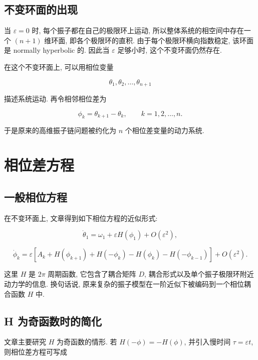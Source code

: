 \documentclass[oneside]{ctexart}
\newcommand{\eps}{\varepsilon}
\begin{document}
\subsection{不变环面的出现}

当 $\eps=0$ 时, 每个振子都在自己的极限环上运动, 所以整体系统的相空间中存在一个 $(n+1)$ 维环面, 即各个极限环的直积. 由于每个极限环横向指数稳定, 该环面是 normally hyperbolic 的. 因此当 $\eps$ 足够小时, 这个不变环面仍然存在.

在这个不变环面上, 可以用相位变量

\begin{equation}
    \theta_1,\theta_2,\dots,\theta_{n+1}
\end{equation}

描述系统运动. 再令相邻相位差为

\begin{equation}
    \phi_k=\theta_{k+1}-\theta_k,
    \qquad k=1,2,\dots,n.
\end{equation}

于是原来的高维振子链问题被约化为 $n$ 个相位差变量的动力系统.

\section{相位差方程}

\subsection{一般相位方程}

在不变环面上, 文章得到如下相位方程的近似形式:

\begin{equation}
    \dot{\theta}_1=\omega_1+\eps H(\phi_1)+O(\eps^2),
\end{equation}

\begin{equation}
    \dot{\phi}_k
    =\eps\left[A_k+H(\phi_{k+1})+H(-\phi_k)-H(\phi_k)-H(-\phi_{k-1})\right]+O(\eps^2).
\end{equation}

这里 $H$ 是 $2\pi$ 周期函数, 它包含了耦合矩阵 $D$, 耦合形式以及单个振子极限环附近动力学的信息. 换句话说, 原来复杂的振子模型在一阶近似下被编码到一个相位耦合函数 $H$ 中.

\subsection{H 为奇函数时的简化}

文章主要研究 $H$ 为奇函数的情形. 若 $H(-\phi)=-H(\phi)$, 并引入慢时间 $\tau=\eps t$, 则相位差方程可写成
\end{document}
